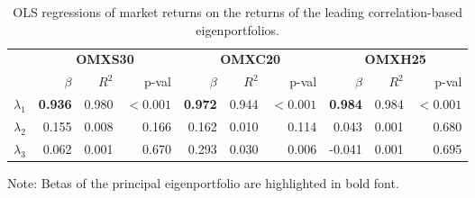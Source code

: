 \begin{table}[t!]
\centering
\renewcommand{\arraystretch}{1.15}
\setlength{\tabcolsep}{6pt}
\caption{OLS regressions of market returns on the returns of the leading correlation-based eigenportfolios.}
\label{tab:nordic_eigenbeta}
\small
\begin{tabular}{l rrr rrr rrr}
\hline
& \multicolumn{3}{c}{\textbf{OMXS30}} & \multicolumn{3}{c}{\textbf{OMXC20}} & \multicolumn{3}{c}{\textbf{OMXH25}} \\
\textbf{} & {$\beta$} & {$R^2$} & {p-val} & {$\beta$} & {$R^2$} & {p-val} & {$\beta$} & {$R^2$} & {p-val} \\
\hline
$\lambda_1$ & \textbf{0.936} & 0.980 & $<0.001$ & \textbf{0.972} & 0.944 & $<0.001$ & \textbf{0.984} & 0.984 & $<0.001$ \\
$\lambda_2$ & 0.155 & 0.008 & 0.166 & 0.162 & 0.010 & 0.114 & 0.043 & 0.001 & 0.680 \\
$\lambda_3$ & 0.062 & 0.001 & 0.670 & 0.293 & 0.030 & 0.006 & -0.041 & 0.001 & 0.695 \\
\hline
\end{tabular}

Note: Betas of the principal eigenportfolio are highlighted in bold font.
\end{table}
